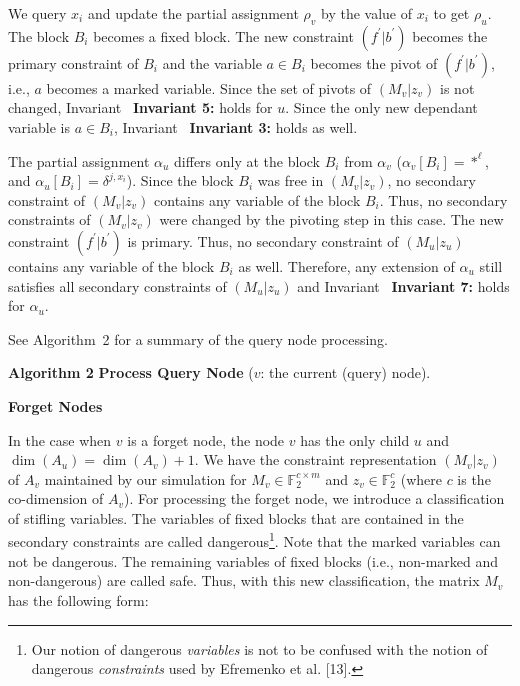 \documentclass[10pt,a4paper]{article}
\begin{document}
We query $x_{i}$ and update the partial assignment $\rho_{v}$ by the value of $x_{i}$ to get $\rho_{u}$.
The block $B_{i}$ becomes a fixed block.
The new constraint $(f^{\prime}|b^{\prime})$ becomes the primary constraint of $B_{i}$ and the variable $a\in B_{i}$ becomes the pivot of $(f^{\prime}|b^{\prime})$, i.e., $a$ becomes a marked variable.
Since the set of pivots of $(M_{v}|z_{v})$ is not changed, Invariant \textbf{ Invariant 5:} holds for $u$.
Since the only new dependant variable is $a\in B_{i}$, Invariant \textbf{ Invariant 3:} holds as well.\par




The partial assignment $\alpha_{u}$ differs only at the block $B_{i}$ from $\alpha_{v}$ ($\alpha_{v}[B_{i}]=*^{\ell}$, and $\alpha_{u}[B_{i}]=\delta^{j,x_{i}}$).
Since the block $B_{i}$ was free in $(M_{v}|z_{v})$, no secondary constraint of $(M_{v}|z_{v})$ contains any variable of the block $B_{i}$.
Thus, no secondary constraints of $(M_{v}|z_{v})$ were changed by the pivoting step in this case.
The new constraint $(f^{\prime}|b^{\prime})$ is primary.
Thus, no secondary constraint of $(M_{u}|z_{u})$ contains any variable of the block $B_{i}$ as well.
Therefore, any extension of $\alpha_{u}$ still satisfies all secondary constraints of $(M_{u}|z_{u})$ and Invariant \textbf{ Invariant 7:} holds for $\alpha_{u}$.\par




See Algorithm 2 for a summary of the query node processing.\par



\textbf{Algorithm 2}  \textbf{Process Query Node} ($v$: the current (query) node).





\par\medskip\noindent\textbf{Forget Nodes}\par




In the case when $v$ is a forget node, the node $v$ has the only child $u$ and $\dim(A_{u})=\dim(A_{v})+1$.
We have the constraint representation $(M_{v}|z_{v})$ of $A_{v}$ maintained by our simulation for $M_{v}\in\mathbb{F}_{2}^{c\times m}$ and $z_{v}\in\mathbb{F}_{2}^{c}$ (where $c$ is the co-dimension of $A_{v}$).
For processing the forget node, we introduce a classification of stifling variables.
The variables of fixed blocks that are contained in the secondary constraints are called dangerous\footnote{Our notion of dangerous \emph{variables} is not to be confused with the notion of dangerous \emph{constraints} used by Efremenko et al. [13].}.
Note that the marked variables can not be dangerous.
The remaining variables of fixed blocks (i.e., non-marked and non-dangerous) are called safe.
Thus, with this new classification, the matrix $M_{v}$ has the following form:\par
\end{document}

